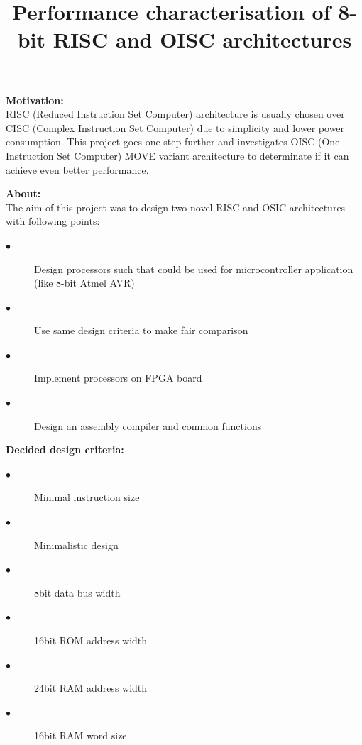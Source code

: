 \documentclass[portrait,color=UCLmidgreen,margin=1.5cm,bannerheight=8cm,logoheight=2.5cm]{uclposter}
\title{Performance characterisation of 8-bit RISC and OISC architectures}
\begin{document}

\maketitle
{}
\newcommand{\strutm}{\rule[-.15\baselineskip]{0pt}{\baselineskip}}

\begin{tcolorbox}[title=Introduction]
	\begin{Row}\begin{Cell}{2}
	\textbf{Motivation:}\\
	RISC (Reduced Instruction Set Computer) architecture is usually chosen over CISC (Complex Instruction Set Computer) due to simplicity and lower power consumption. This project goes one step further and investigates OISC (One Instruction Set Computer) MOVE variant architecture to determinate if it can achieve even better performance.
	\end{Cell}\begin{Cell}{2}
	\textbf{About:}\\
	The aim of this project was to design two novel RISC and OSIC architectures with following points:
	\begin{description}
		\item[$\bullet$] Design processors such that could be used for microcontroller application (like 8-bit Atmel AVR)
		\item[$\bullet$] Use same design criteria to make fair comparison
		\item[$\bullet$] Implement processors on FPGA board
		\item[$\bullet$] Design an assembly compiler and common functions
	\end{description} 
	\end{Cell}\begin{Cell}{1}
	\textbf{Decided design criteria:}
	\begin{description}
		\item[$\bullet$] Minimal instruction size
		\item[$\bullet$] Minimalistic design
		\item[$\bullet$] 8bit data bus width
		\item[$\bullet$] 16bit ROM address width
		\item[$\bullet$] 24bit RAM address width
		\item[$\bullet$] 16bit RAM word size
	\end{description}
	\end{Cell}\end{Row}
\end{tcolorbox}
\end{document}
